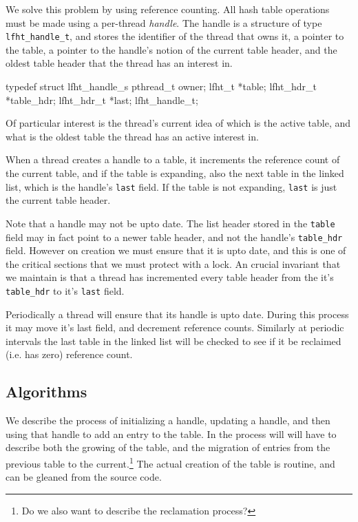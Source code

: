 We solve this problem by using reference counting.
All hash table operations must be made using a per-thread {\em handle\/}. The handle is  a
structure of type \texttt{lfht\_handle\_t}, and stores
the identifier of the thread that owns it, a pointer to the table, a pointer to the handle's notion
of the current table header, and the oldest table header that the thread has an interest in.

\begin{center}
\begin{clisting}
typedef struct lfht_handle_s {
  pthread_t owner;
  lfht_t *table;
  lfht_hdr_t *table_hdr;
  lfht_hdr_t *last;  
} lfht_handle_t;
\end{clisting}
\end{center}

Of particular interest is the thread's current idea of which
is the active table, and what is the oldest table the thread has
an active interest in.


When a thread creates a handle to a table, it increments the reference
count of the current table, and if the table is expanding, also the
next table in the linked list, which is the handle's \texttt{last} field.  If
the table is not expanding, \texttt{last} is just the current table header.

Note that a handle may not be upto date. The list
header stored in the \texttt{table} field may in fact point to a newer table header,
and not the handle's \texttt{table\_hdr}
field. However on creation we must ensure that it is upto date, and
this is one of the critical sections that we must protect with a lock.
An crucial invariant that we maintain is that a thread has incremented
every table header from the it's \texttt{table\_hdr} to it's \texttt{last}
field.

Periodically a thread will ensure that its handle is upto date. During this process
it may move it's last field, and decrement reference counts. Similarly
at periodic intervals the last table in the linked list will be checked to see
if it be reclaimed (i.e. has zero) reference count.


\subsection{Algorithms}


We describe the process of initializing a handle, updating a handle, and then using that handle
to add an entry to the table. In the process will will have to describe both the growing of the table,
and the migration of entries from the previous table to the
current.\footnote{Do we also want to describe the reclamation process?}
The actual creation of the table is routine,
and can be gleaned from the source code\cite{lfht2017}.


